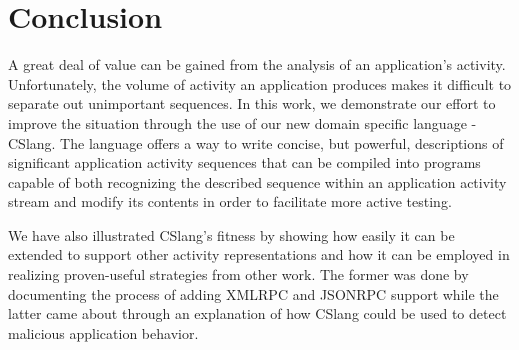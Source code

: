 \section{Conclusion}
\label{sec:Conclusion}
%
%

A great deal of value can be gained from the analysis of an application's
activity.
Unfortunately,
the volume of activity
an application produces
makes it difficult
to separate out
unimportant sequences.
In this work,
we demonstrate our effort
to improve the situation
through the use of
our new domain specific language
- CSlang.
The language offers
a way to write concise,
but powerful,
descriptions of
significant application activity sequences
that can be compiled
into programs capable of
both recognizing the described sequence
within an application activity stream
and modify its contents in order to
facilitate more active testing.

We have also
illustrated CSlang's fitness
by showing
how easily it
can be extended
to support other activity
representations
and how it can be employed
in realizing proven-useful
strategies from other work.
The former was done
by documenting the process
of adding XMLRPC and JSONRPC support
while the latter came about
through an explanation
of how CSlang could be used to
detect malicious application behavior.

